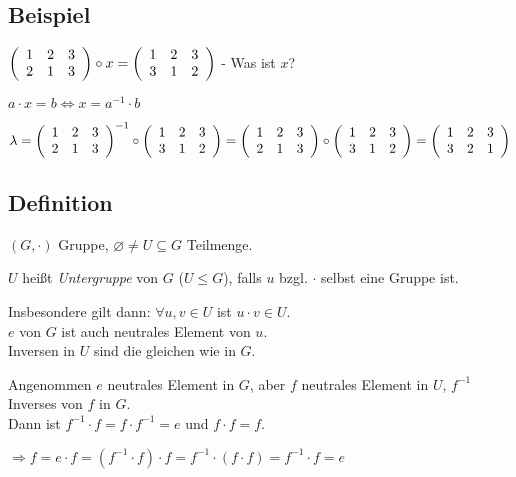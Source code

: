  
 \subsection{Beispiel}
 $
 \aMatrix{ccc}{
 	1 & 2 & 3 \\
 	2 & 1 & 3
 	}\circ
 	x =
 \aMatrix{ccc}{
 	1 & 2 & 3 \\
 	3 & 1 & 2
 	}
 	$
 - Was ist $x$?
 
 $ a \cdot x = b \Leftrightarrow x=a^{-1} \cdot b$
 
 $
 \lambda =
  \aMatrix{ccc}{
  	1 & 2 & 3 \\
  	2 & 1 & 3
  }^{-1}\circ
 \aMatrix{ccc}{
 	1 & 2 & 3 \\
 	3 & 1 & 2
 } = 
  \aMatrix{ccc}{
  	1 & 2 & 3 \\
  	2 & 1 & 3
  }\circ
  \aMatrix{ccc}{
  	1 & 2 & 3 \\
  	3 & 1 & 2
  } =
  \aMatrix{ccc}{
  	1 & 2 & 3 \\
  	3 & 2 & 1
  }
  $

\subsection[Definition: Untergruppe]{Definition}

$(G,\cdot)$ Gruppe, $\varnothing \neq U \subseteq G$ Teilmenge.

$U$ heißt \emph{Untergruppe} von $G$ ($U\leqslant G$), falls $u$ bzgl. $\cdot$ selbst eine Gruppe ist.

Insbesondere gilt dann:
$\forall u,v \in U$ ist $u \cdot v \in  U$.\\
$e$ von $G$ ist auch neutrales Element von $u$.\\
Inversen in $U$ sind die gleichen wie in $G$.

Angenommen $e$ neutrales Element in $G$, aber $f$ neutrales Element in $U$, $f^{-1}$ Inverses von $f$ in $G$.\\
Dann ist $f^{-1} \cdot f= f \cdot f^{-1} = e$ und $f\cdot f = f$.

$\Rightarrow f = e \cdot f = (f^{-1} \cdot f) \cdot f = f^{-1} \cdot (f \cdot f) = f^{-1} \cdot f = e$

